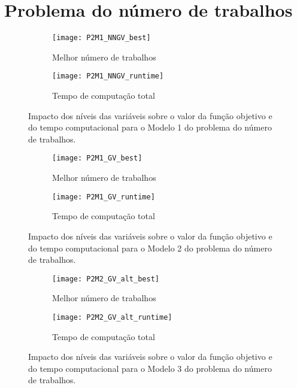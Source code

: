 \section{Problema do número de trabalhos}

\begin{figure}[H]
	\centering
	\begin{subfigure}{0.49\textwidth}
	\centering
		\texttt{[image: P2M1\_NNGV\_best]}
		\caption{Melhor número de trabalhos}
		\label{fig:P2M1_NNGV_best}
	\end{subfigure}
	\begin{subfigure}{0.49\textwidth}
	\centering
		\texttt{[image: P2M1\_NNGV\_runtime]}
		\caption{Tempo de computação total}
		\label{fig:P2M1_NNGV_runtime}
	\end{subfigure}
	\caption{Impacto dos níveis das variáveis sobre o valor da função objetivo e do tempo computacional para o Modelo 1 do problema do número de trabalhos.}
	\label{fig:P2M1_NNGV_alt}
\end{figure}

\begin{figure}[H]
	\centering
	\begin{subfigure}{0.49\textwidth}
	\centering
		\texttt{[image: P2M1\_GV\_best]}
		\caption{Melhor número de trabalhos}
		\label{fig:P2M1_GV_best}
	\end{subfigure}
	\begin{subfigure}{0.49\textwidth}
	\centering
		\texttt{[image: P2M1\_GV\_runtime]}
		\caption{Tempo de computação total}
		\label{fig:P2M1_GV_runtime}
	\end{subfigure}
	\caption{Impacto dos níveis das variáveis sobre o valor da função objetivo e do tempo computacional para o Modelo 2 do problema do número de trabalhos.}
	\label{fig:P2M1_GV_alt}
\end{figure}

\begin{figure}[H]
	\centering
	\begin{subfigure}{0.49\textwidth}
	\centering
		\texttt{[image: P2M2\_GV\_alt\_best]}
		\caption{Melhor número de trabalhos}
		\label{fig:P2M2_GV_alt_best}
	\end{subfigure}
	\begin{subfigure}{0.49\textwidth}
	\centering
		\texttt{[image: P2M2\_GV\_alt\_runtime]}
		\caption{Tempo de computação total}
		\label{fig:P2M2_GV_alt_runtime}
	\end{subfigure}
	\caption{Impacto dos níveis das variáveis sobre o valor da função objetivo e do tempo computacional para o Modelo 3 do problema do número de trabalhos.}
	\label{fig:P2M2_GV_alt_alt}
\end{figure}


